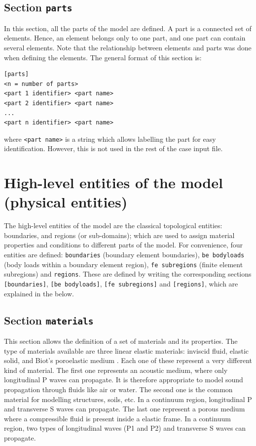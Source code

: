 \documentclass[a4paper,fleqn]{book}
\begin{document}
\subsection{Section \texttt{parts}}
\label{sec:parts}

In this section, all the parts of the model are defined. A part is a connected set of elements. Hence, an element belongs only to one part, and one part can contain several elements. Note that the relationship between elements and parts was done when defining the elements. The general format of this section is:
\begin{Verbatim}[frame=single, fontsize=\small, label={general format of section [parts]}]
[parts]
<n = number of parts>
<part 1 identifier> <part name> 
<part 2 identifier> <part name> 
...
<part n identifier> <part name> 
\end{Verbatim} 
where \texttt{<part name>} is a string which allows labelling the part for easy identification. However, this is not used in the rest of the case input file.

\section{High-level entities of the model (physical entities)}

The high-level entities of the model are the classical topological entities: boundaries, and regions (or sub-domains); which are used to assign material properties and conditions to different parts of the model. For convenience, four entities are defined: \texttt{boundaries} (boundary element boundaries), \texttt{be bodyloads} (body loads within a boundary element region), \texttt{fe subregions} (finite element subregions) and \texttt{regions}. These are defined by writing the corresponding sections \texttt{[boundaries]}, \texttt{[be bodyloads]}, \texttt{[fe subregions]} and \texttt{[regions]}, which are explained in the below.

\subsection{Section \texttt{materials}}
\label{sec:materials}

This section allows the definition of a set of materials and its properties. The type of materials available are three linear elastic materials: inviscid fluid, elastic solid, and Biot's poroelastic medium \cite{biot1956}. Each one of these represent a very different kind of material. The first one represents an acoustic medium, where only longitudinal P waves can propagate. It is therefore appropriate to model sound propagation through fluids like air or water. The second one is the common material for modelling structures, soils, etc. In a continuum region, longitudinal P and transverse S waves can propagate. The last one represent a porous medium where a compressible fluid is present inside a elastic frame. In a continuum region, two types of longitudinal waves (P1 and P2) and transverse S waves can propagate.
\end{document}
